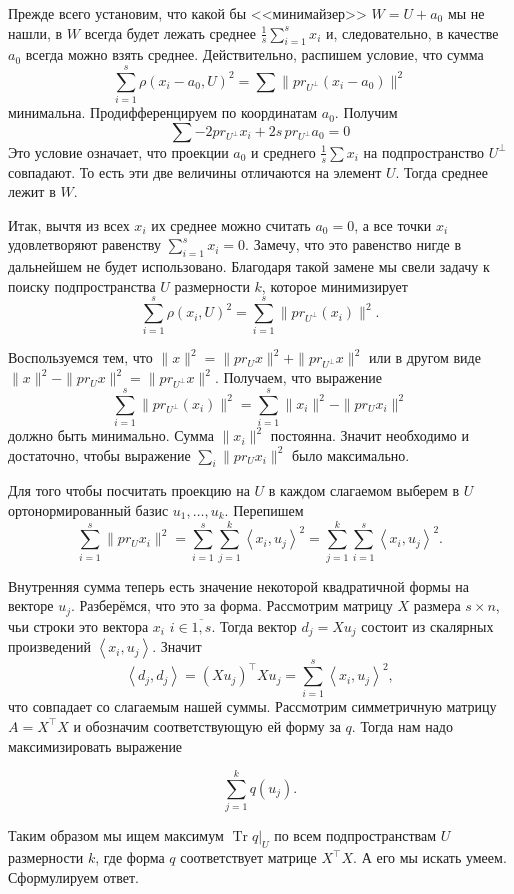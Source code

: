 \documentclass[10pt,a4paper,oneside]{book}
\theoremstyle{definition}
\newcommand{\ovl}{\overline}
\newcommand{\Tr}{\operatorname{Tr}}
\def\lan{\left\langle }
\def\ran{\right\rangle}
\begin{document}
Прежде всего установим, что какой бы <<минимайзер>> $W=U+a_0$ мы не нашли, в $W$ всегда будет лежать среднее $\frac{1}{s}\sum_{i=1}^s x_i$ и, следовательно, в качестве $a_0$ всегда можно взять среднее. Действительно, распишем условие, что сумма 
$$\sum_{i=1}^s \rho(x_i-a_0, U)^2=\sum \|pr_{U^{\bot}} (x_i-a_0)\|^2$$
минимальна.  Продифференцируем по координатам $a_0$. Получим $$\sum -2pr_{U^{\bot}} x_i + 2s \,pr_{U^{\bot}} a_0=0$$
 Это условие означает, что проекции $a_0$ и среднего $\frac{1}{s}\sum x_i$ на подпространство $U^{\bot}$ совпадают. То есть эти две величины отличаются на элемент $U$. Тогда среднее лежит в $W$. 

Итак, вычтя из всех $x_i$ их среднее можно считать $a_0=0$, а все точки $x_i$ удовлетворяют равенству $\sum_{i=1}^s x_i=0$. Замечу, что это равенство нигде в дальнейшем не будет использовано. Благодаря такой замене мы свели задачу к поиску подпространства $U$ размерности $k$, которое минимизирует 
$$\sum_{i=1}^s \rho(x_i, U)^2=\sum_{i=1}^s \|pr_{U^{\bot}} (x_i)\|^2.$$

Воспользуемся тем, что $\|x\|^2=\|pr_U x\|^2+\|pr_{U^{\bot}} x\|^2$ или в другом виде $\|x\|^2-\|pr_U x\|^2=\|pr_{U^{\bot}} x\|^2$. Получаем, что выражение
$$\sum_{i=1}^s \|pr_{U^{\bot}}(x_i)\|^2=\sum_{i=1}^s \|x_i\|^2-\|pr_U x_i\|^2$$
должно быть минимально. Сумма $\|x_i\|^2$ постоянна. Значит  необходимо и достаточно, чтобы выражение $\sum_i \|pr_U x_i\|^2$ было максимально.


Для того чтобы посчитать проекцию на $U$ в каждом слагаемом выберем в $U$ ортонормированный базис $u_1,\dots,u_k$. Перепишем
$$\sum_{i=1}^s \|pr_U x_i\|^2=\sum_{i=1}^s\sum_{j=1}^k \lan x_i,u_j\ran^2=\sum_{j=1}^k \sum_{i=1}^s \lan x_i,u_j\ran^2.$$

Внутренняя сумма теперь есть значение некоторой квадратичной формы на векторе $u_j$. Разберёмся, что это за форма. Рассмотрим матрицу $X$ размера $s\times n$, чьи строки это  вектора $x_i$ $i\in\ovl{1,s}$. Тогда вектор $d_j=Xu_j$ состоит из скалярных произведений  $\lan x_i, u_j\ran$. Значит 
$$\lan d_j,d_j\ran = (Xu_j)^{\top}Xu_j = \sum_{i=1}^s \lan x_i,u_j\ran^2,$$ 
что совпадает со слагаемым нашей суммы. Рассмотрим симметричную матрицу $A=X^{\top}X$ и обозначим соответствующую ей форму за $q$. Тогда нам надо максимизировать выражение

$$\sum_{j=1}^k q(u_j).$$

Таким образом мы ищем максимум $\Tr q|_{U}$ по всем подпространствам $U$ размерности $k$, где форма $q$ соответствует матрице $X^{\top} X$. А его мы искать умеем. Сформулируем  ответ. 
\end{document}
